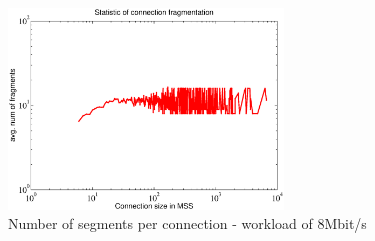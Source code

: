 \documentclass[preprint,12pt]{elsarticle}
\begin{document}
\begin{figure}[ht]
  \centering
  \includegraphics[width=0.65\textwidth]{./fig/analysis/internal_dynamics/segment_8}
  \caption{Number of segments per connection - workload of 8Mbit/s}
  \label{fig:seg8}
\end{figure}

%
 
\end{document}
